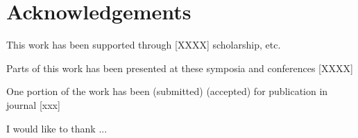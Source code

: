 \chapter{Acknowledgements}

This work has been supported through [XXXX] scholarship, etc.

Parts of this work has been presented at these symposia and conferences [XXXX]

One portion of the work has been (submitted) (accepted) for publication in journal [xxx]

I would like to thank ...
